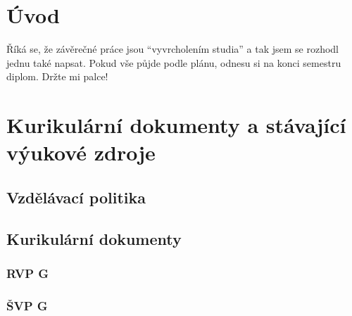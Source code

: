 \documentclass[
  digital,     %
  oneside,     %
  nosansbold,  %
  colorbold, %
  lof,         %
  nolot,         %
]{fithesis4}
\begin{document}

\chapter{Úvod}

Říká se, že závěrečné práce jsou \enquote{vyvrcholením studia}
a tak jsem se rozhodl jednu také napsat. Pokud vše půjde podle
plánu, odnesu si na konci semestru diplom. Držte mi palce!

\chapter{Kurikulární dokumenty a stávající výukové zdroje}

\section{Vzdělávací politika}
\section{Kurikulární dokumenty}
\subsection{RVP G}
\subsection{ŠVP G}

\end{document}
